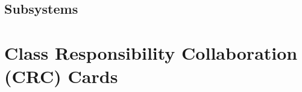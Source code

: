\documentclass[titlepage]{article}
\begin{document}


\subsection{Subsystems}
\label{sub:subsystems}



    
\section{Class Responsibility Collaboration (CRC) Cards}
\label{sec:class_responsibility_collaboration_crc_cards}

%
%    
\end{document}
